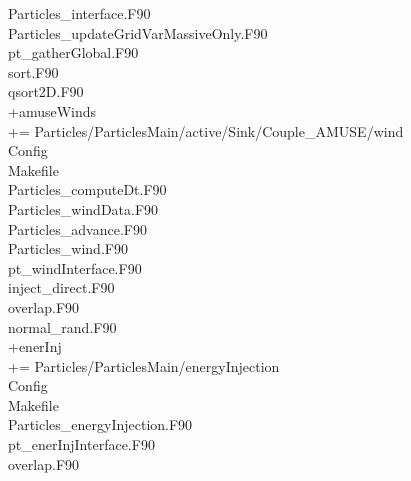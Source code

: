 \documentclass[10pt]{article}
\newcommand*{\tab}{\hspace*{10mm}}
\begin{document}
{\tab\tab Particles\_interface.F90\\
\tab\tab Particles\_updateGridVarMassiveOnly.F90\\
\tab\tab pt\_gatherGlobal.F90\\
\tab\tab sort.F90\\
\tab\tab qsort2D.F90\\
+amuseWinds\\
\tab += Particles/ParticlesMain/active/Sink/Couple\_AMUSE/wind\\
\tab\tab Config\\
\tab\tab Makefile\\
\tab\tab Particles\_computeDt.F90\\
\tab\tab Particles\_windData.F90\\
\tab\tab Particles\_advance.F90\\
\tab\tab Particles\_wind.F90\\
\tab\tab pt\_windInterface.F90\\
\tab\tab inject\_direct.F90\\
\tab\tab overlap.F90\\
\tab\tab normal\_rand.F90\\
+enerInj\\
\tab += Particles/ParticlesMain/energyInjection\\
\tab\tab Config\\
\tab\tab Makefile\\
\tab\tab Particles\_energyInjection.F90\\
\tab\tab pt\_enerInjInterface.F90\\
\tab\tab overlap.F90\\
}
\end{document}
